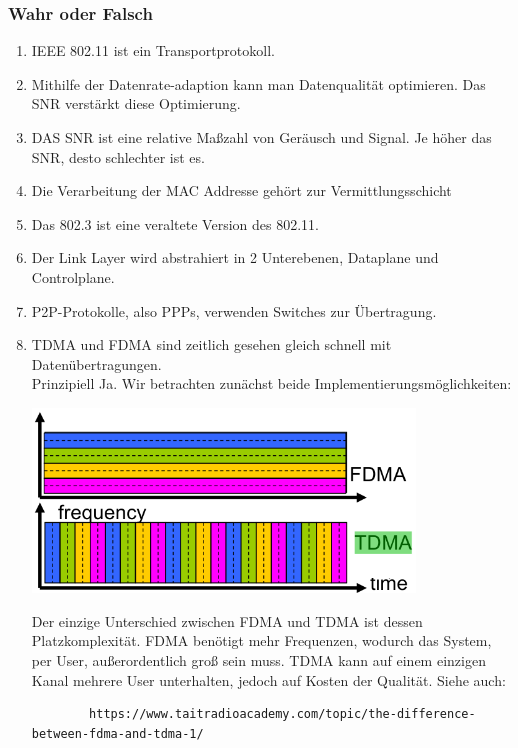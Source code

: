 \documentclass{scrartcl}
\begin{document}
    \subsubsection{Wahr oder Falsch}
    \begin{enumerate}
        \item IEEE 802.11 ist ein Transportprotokoll.
        \item Mithilfe der Datenrate-adaption kann man Datenqualität optimieren. Das SNR verstärkt diese Optimierung.
        \item DAS SNR ist eine relative Maßzahl von Geräusch und Signal. Je höher das SNR, desto schlechter ist es.
        \item Die Verarbeitung der MAC Addresse gehört zur Vermittlungsschicht
        \item Das 802.3 ist eine veraltete Version des 802.11.
        \item Der Link Layer wird abstrahiert in 2 Unterebenen, Dataplane und Controlplane.
        \item P2P-Protokolle, also PPPs, verwenden Switches zur Übertragung.\\
        
        
        \item TDMA und FDMA sind zeitlich gesehen gleich schnell mit Datenübertragungen.\\
        Prinzipiell Ja. Wir betrachten zunächst beide Implementierungsmöglichkeiten:
        \begin{center}
            \includegraphics[width=0.8\textwidth]{TDMAvsFDMA.png}
        \end{center}
        Der einzige Unterschied zwischen FDMA und TDMA ist dessen Platzkomplexität. FDMA benötigt mehr Frequenzen, wodurch das System, per User, außerordentlich groß sein muss.
        TDMA kann auf einem einzigen Kanal mehrere User unterhalten, jedoch auf Kosten der Qualität.
        Siehe auch: 
        \begin{verbatim}
        https://www.taitradioacademy.com/topic/the-difference-between-fdma-and-tdma-1/
        \end{verbatim}
        

\end{enumerate}
\end{document}
